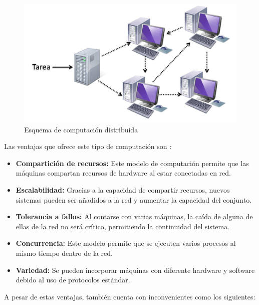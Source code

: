 \begin{figure}[htp!]
	\centering
	\caption{Esquema de computación distribuida \cite{fotodistribuida}}
	\label{distribuida}
	\vspace{5pt}
	\includegraphics[scale=0.3]{graphics/computaciondistribuida}
\end{figure}

Las ventajas que ofrece este tipo de computación son \cite{sistDistTeoria}:

\begin{itemize}
	\item \textbf{Compartición de recursos:} Este modelo de computación permite que las máquinas compartan recursos de hardware al estar conectadas en red.
	
	\item \textbf{Escalabilidad:} Gracias a la capacidad de compartir recursos, nuevos sistemas pueden ser añadidos a la red y aumentar la capacidad del conjunto.
	
	\item \textbf{Tolerancia a fallos:} Al contarse con varias máquinas, la caída de alguna de ellas de la red no será crítico, permitiendo la continuidad del sistema.
	
	\item \textbf{Concurrencia:} Este modelo permite que se ejecuten varios procesos al mismo tiempo dentro de la red.
	
	\item \textbf{Variedad:} Se pueden incorporar máquinas con diferente hardware y software debido al uso de protocolos estándar.
\end{itemize}

A pesar de estas ventajas, también cuenta con inconvenientes como los siguientes:

